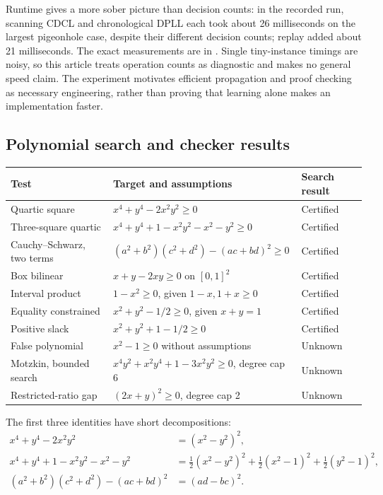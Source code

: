 \documentclass[11pt,letterpaper]{article}
\newcommand{\code}[1]{\texttt{\detokenize{#1}}}
\theoremstyle{definition}\newtheorem{definition}[proposition]{Definition}
\begin{document}
Runtime gives a more sober picture than decision counts: in the recorded run, scanning CDCL and chronological DPLL each took about 26 milliseconds on the largest pigeonhole case, despite their different decision counts; replay added about 21 milliseconds. The exact measurements are in \code{benchmarks.csv}. Single tiny-instance timings are noisy, so this article treats operation counts as diagnostic and makes no general speed claim. The experiment motivates efficient propagation and proof checking as necessary engineering, rather than proving that learning alone makes an implementation faster.

\subsection{Polynomial search and checker results}
\begin{longtable}{@{}P{0.24\textwidth}P{0.53\textwidth}P{0.17\textwidth}@{}}
\toprule
Test & Target and assumptions & Search result \\
\midrule\endhead
Quartic square & $x^4+y^4-2x^2y^2\ge0$ & Certified \\
Three-square quartic & $x^4+y^4+1-x^2y^2-x^2-y^2\ge0$ & Certified \\
Cauchy--Schwarz, two terms & $(a^2+b^2)(c^2+d^2)-(ac+bd)^2\ge0$ & Certified \\
Box bilinear & $x+y-2xy\ge0$ on $[0,1]^2$ & Certified \\
Interval product & $1-x^2\ge0$, given $1-x,1+x\ge0$ & Certified \\
Equality constrained & $x^2+y^2-1/2\ge0$, given $x+y=1$ & Certified \\
Positive slack & $x^2+y^2+1-1/2\ge0$ & Certified \\
False polynomial & $x^2-1\ge0$ without assumptions & Unknown \\
Motzkin, bounded search & $x^4y^2+x^2y^4+1-3x^2y^2\ge0$, degree cap 6 & Unknown \\
Restricted-ratio gap & $(2x+y)^2\ge0$, degree cap 2 & Unknown \\
\bottomrule
\end{longtable}

The first three identities have short decompositions:
\begin{align*}
x^4+y^4-2x^2y^2&=(x^2-y^2)^2,\\
x^4+y^4+1-x^2y^2-x^2-y^2
&=\tfrac12(x^2-y^2)^2+\tfrac12(x^2-1)^2+\tfrac12(y^2-1)^2,\\
(a^2+b^2)(c^2+d^2)-(ac+bd)^2&=(ad-bc)^2.
\end{align*}
\end{document}
